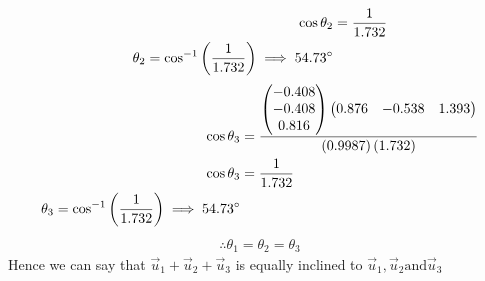 \documentclass[11pt]{book}
\begin{document}
\begin{enumerate}
\begin{align}
    \cos{\theta_2}&=\frac{1}{1.732}\\
    \theta_2=\cos^{-1}\left(\frac{1}{1.732}\right)
    \implies 54.73\degree
\end{align}
\begin{align}
     \cos{\theta_3}&=\frac{\begin{pmatrix}-0.408 \\-0.408\\0.816\end{pmatrix}\begin{pmatrix}0.876&-0.538&1.393\end{pmatrix}}{\left(0.9987\right)\left(1.732\right)}\\
    \cos{\theta_3}&=\frac{1}{1.732}\\
    \theta_3=\cos^{-1}\left(\frac{1}{1.732}\right)
    \implies 54.73\degree
\end{align}
\begin{align*}
    \therefore  \theta_1=\theta_2=\theta_3
\end{align*}
Hence  we can say that $\vec{u}_1+\vec{u}_2+\vec{u}_3 $ is equally inclined to $\vec{u}_1,\vec{u}_2 \text{and} \vec{u}_3  $ 
\end{enumerate}
\end{document}
